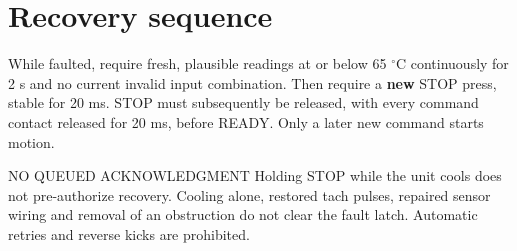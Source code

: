 \documentclass[10pt]{article}
\begin{document}
\section*{Recovery sequence}
While faulted, require fresh, plausible readings at or below 65 $^\circ$C continuously for 2 s and no current invalid input combination. Then require a \textbf{new} STOP press, stable for 20 ms. STOP must subsequently be released, with every command contact released for 20 ms, before READY. Only a later new command starts motion.
\begin{Notice}{NO QUEUED ACKNOWLEDGMENT}
Holding STOP while the unit cools does not pre-authorize recovery. Cooling alone, restored tach pulses, repaired sensor wiring and removal of an obstruction do not clear the fault latch. Automatic retries and reverse kicks are prohibited.
\end{Notice}
\vfill{}
\end{document}

